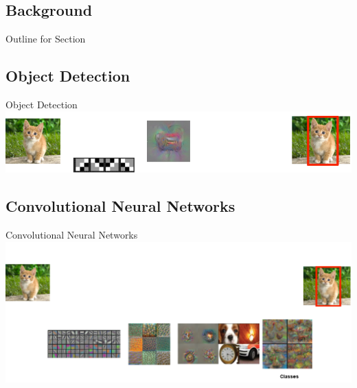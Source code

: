 \documentclass{beamer}
\begin{document}
\begin{darkframes}
    \section{Background}
    \begin{frame}{Outline for Section \thesection}
    \tableofcontents[currentsection]
	\end{frame}
\subsection{Object Detection}
	\begin{frame}{Object Detection}
	\includegraphics[width=\textwidth]{fig/ObjectDetection}
	\end{frame}
	\subsection{Convolutional Neural Networks}
		\begin{frame}{Convolutional Neural Networks}
	\includegraphics[width=\textwidth]{fig/cnn_mine}
\end{frame}


\end{darkframes}
\end{document}
